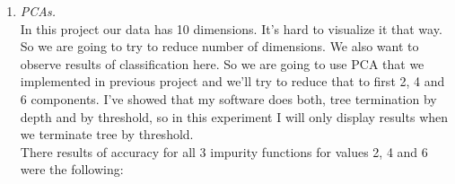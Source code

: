 \documentclass[12pt, letterpaper]{article}
\begin{document}
\begin{enumerate}[label=\Roman*.]
\begin{enumerate}[label=\arabic*.]
		\item {\it PCAs. }\\ 
		
		In this project our data has 10 dimensions. It's hard to visualize it that way. So we are going to try to reduce number of dimensions. We also want to observe results of classification here.  So we are going to use PCA that we implemented in previous project and we'll try to reduce that to first 2, 4 and 6 components. I've showed that my software does both, tree termination by depth and by threshold, so in this experiment I will only display results when we terminate tree by threshold. \\
		
		There results of accuracy for all 3 impurity functions for values 2, 4 and 6 were the following: \\
		

\end{enumerate}
\end{enumerate}
\end{document}
